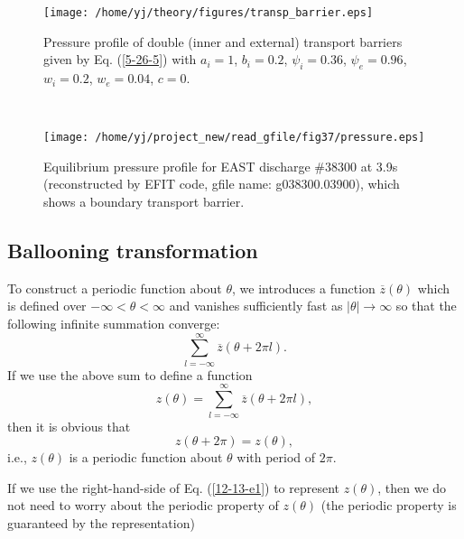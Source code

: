 \documentclass{llncs}
\begin{document}
\begin{figure}[h]
  \texttt{[image: /home/yj/theory/figures/transp\_barrier.eps]}
  \caption{Pressure profile of double (inner and external) transport barriers
  given by Eq. (\ref{5-26-5}) with $a_i = 1$, $b_i = 0.2$, $\psi_i = 0.36$,
  $\psi_e = 0.96$, $w_i = 0.2$, $w_e = 0.04$, $c = 0$.}
\end{figure}

\

\begin{figure}[h]
  \texttt{[image: /home/yj/project\_new/read\_gfile/fig37/pressure.eps]}
  \caption{Equilibrium pressure profile for EAST discharge \#38300 at 3.9s
  (reconstructed by EFIT code, gfile name: g038300.03900), which shows a
  boundary transport barrier.}
\end{figure}

\subsection{Ballooning transformation}

To construct a periodic function about $\theta$, we introduces a function
$\overline{z} (\theta)$ which is defined over $- \infty < \theta < \infty$ and
vanishes sufficiently fast as $| \theta | \rightarrow \infty$ so that the
following infinite summation converge:
\begin{equation}
  \sum_{l = - \infty}^{\infty} \overline{z} (\theta + 2 \pi l) .
\end{equation}
If we use the above sum to define a function
\begin{equation}
  \label{12-13-e1} z (\theta) = \sum_{l = - \infty}^{\infty} \overline{z}
  (\theta + 2 \pi l),
\end{equation}
then it is obvious that
\begin{equation}
  z (\theta + 2 \pi) = z (\theta),
\end{equation}
i.e., $z (\theta)$ is a periodic function about $\theta$ with period of $2
\pi$.

If we use the right-hand-side of Eq. (\ref{12-13-e1}) to represent $z
(\theta)$, then we do not need to worry about the periodic property of $z
(\theta)$ (the periodic property is guaranteed by the representation)

\appendix\section{}
\end{document}
